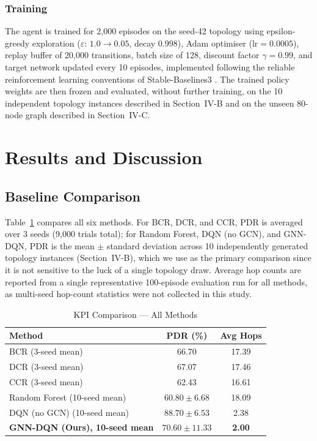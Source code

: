 \documentclass[conference]{IEEEtran}
\begin{document}
\subsubsection{Training}
The agent is trained for 2,000 episodes on the seed-42 topology
using epsilon-greedy exploration ($\varepsilon$: $1.0 \rightarrow
0.05$, decay 0.998), Adam optimiser ($\text{lr} = 0.0005$), replay
buffer of 20,000 transitions, batch size of 128, discount
factor $\gamma = 0.99$, and target network updated every
10 episodes, implemented following the reliable reinforcement
learning conventions of Stable-Baselines3 \cite{raffin2021}. The
trained policy weights are then frozen and evaluated, without
further training, on the 10 independent topology instances
described in Section~IV-B and on the unseen 80-node graph
described in Section~IV-C.

\section{Results and Discussion}

\subsection{Baseline Comparison}
Table~\ref{tab:results} compares all six methods. For BCR, DCR,
and CCR, PDR is averaged over 3 seeds (9,000 trials total); for
Random Forest, DQN (no GCN), and GNN-DQN, PDR is the mean
 $\pm$ standard deviation across 10 independently generated
topology instances (Section~IV-B), which we use as the primary
comparison since it is not sensitive to the luck of a single
topology draw. Average hop counts are reported from a single
representative 100-episode evaluation run for all methods, as
multi-seed hop-count statistics were not collected in this study.

\begin{table}[h]
\centering
\caption{KPI Comparison — All Methods}
\label{tab:results}
\begin{tabular}{lcc}
\toprule
\textbf{Method} & \textbf{PDR (\%)} & \textbf{Avg Hops} \\
\midrule
BCR \cite{wan2021} (3-seed mean) & 66.70 & 17.39 \\
DCR (3-seed mean)                & 67.07 & 17.46 \\
CCR (3-seed mean)                & 62.43 & 16.61 \\
Random Forest (10-seed mean)     & $60.80 \pm 6.68$ & 18.09 \\
DQN (no GCN) (10-seed mean)      & $88.70 \pm 6.53$ & 2.38 \\
\textbf{GNN-DQN (Ours), 10-seed mean} & $\mathbf{70.60 \pm 11.33}$ & \textbf{2.00} \\
\bottomrule
\end{tabular}
\end{table}
\end{document}

